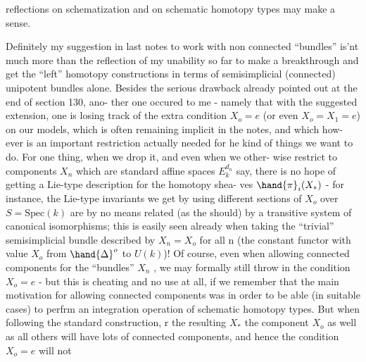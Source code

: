 reflections on schematization and on schematic homotopy types may make a
sense.

Definitely my suggestion in  last notes\hand{,} to work with non connected
``bundles''\hand{,} is'nt much more than the reflection of my unability so far to
make a breakthrough and get the ``left'' homotopy constructions
in terms of semisimplicial (connected) unipotent bundles alone. Besides
the serious drawback already pointed out at the end of section 130, ano-%
ther one occured to me - namely that with the suggested extension, one
is losing track of the extra condition $X_o=e$ (or even $X_o=X_1=e$) on our
models, which is often remaining implicit in the notes, and which how-%
ever is an important restriction\hand{,} actually needed for he kind of things
we want to do. For one thing, when we drop it, and even when we other-%
wise restrict to components $X_n$ which are standard affine spaces $E^{d_n}_k$ say,
there is no hope of getting a Lie-type description for the homotopy shea-%
ves $\hand{\pi}_i(X_*)$ - for instance, the Lie-type invariants we get  by
using different sections of $X_o$ over $S=\mathrm{Spec}(k)$ are by no means related
(as the  should) by a transitive system of canonical isomorphisms; this
is easily seen already when taking the ``trivial'' semisimplicial bundle
described by $X_n=X_o$ for all n (the constant functor with value $X_o$ from
$\hand{\Delta}^o$ to $U(k)$)! Of course, even when allowing connected components for
the ``bundles'' $X_n$ , we may formally still throw in the condition $X_o=e$
- but this is cheating and no use at all, if we remember that the main
motivation for allowing connected components was in order to be able (in
suitable cases) to perfrm  an integration operation of
schematic homotopy types. But when following the standard construction,
r the resulting $X_*$ the component $X_o$ as well as all others will have
lots of connected components, and hence the condition $X_o=e$ will not
